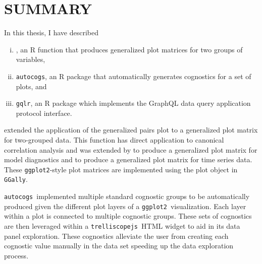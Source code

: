 \documentclass[stat,dissertation]{puthesis}\usepackage[]{graphicx}\usepackage{xcolor}
\newcommand{\pkg}[1]{\texttt{#1}}
\newcommand{\ggplot}{\pkg{ggplot2}}
\newcommand{\trelliscopejs}{\pkg{trelliscopejs}}
\newcommand{\autocogs}{\pkg{autocogs}}
\newcommand{\gqlr}{\pkg{gqlr}}
\newcommand{\GGally}{\pkg{GGally}}
\begin{document}
%
%

\chapter{SUMMARY} %

%
%
%



In this thesis, I have described
\begin{enumerate}[i)]
  \item {}, an R function that produces generalized plot matrices for two groups of variables,
  \item \autocogs, an R package that automatically generates cognostics for a set of plots, and
  \item \gqlr, an R package which implements the GraphQL data query application protocol interface.
\end{enumerate}

 extended the application of the generalized pairs plot to a generalized plot matrix for two-grouped data.  This function has direct application to canonical correlation analysis and was extended by  to produce a generalized plot matrix for model diagnostics and  to produce a generalized plot matrix for time series data.  These \ggplot-style plot matrices are implemented using the  plot object in \GGally.

\autocogs~implemented multiple standard cognostic groups to be automatically produced given the different plot layers of a \ggplot~visualization. Each layer within a plot is connected to multiple cognostic groups.  These sets of cognostics are then leveraged within a \trelliscopejs~HTML widget to aid in its data panel exploration.  These cognostics alleviate the user from creating each cognostic value manually in the data set speeding up the data exploration process.
\end{document}
